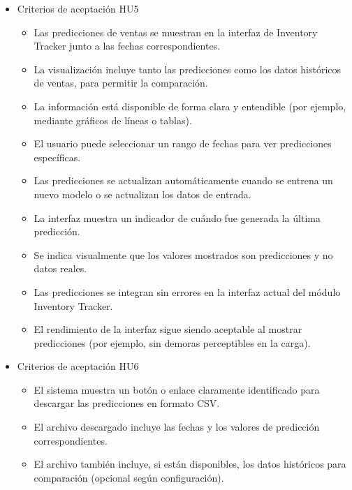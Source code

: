 \documentclass[
11pt, %
]{charter}
\begin{document}
\begin{itemize}
\begin{itemize}
      \item Criterios de aceptación HU5
      \begin{itemize}
      \item Las predicciones de ventas se muestran en la interfaz de Inventory Tracker junto a las fechas correspondientes.

      \item La visualización incluye tanto las predicciones como los datos históricos de ventas, para permitir la comparación.

      \item La información está disponible de forma clara y entendible (por ejemplo, mediante gráficos de líneas o tablas).

      \item El usuario puede seleccionar un rango de fechas para ver predicciones específicas.

      \item Las predicciones se actualizan automáticamente cuando se entrena un nuevo modelo o se actualizan los datos de entrada.

      \item La interfaz muestra un indicador de cuándo fue generada la última predicción.

      \item Se indica visualmente que los valores mostrados son predicciones y no datos reales.

      \item Las predicciones se integran sin errores en la interfaz actual del módulo Inventory Tracker.

      \item El rendimiento de la interfaz sigue siendo aceptable al mostrar predicciones (por ejemplo, sin demoras perceptibles en la carga).
	\end{itemize}
	
      \item Criterios de aceptación HU6
	\begin{itemize}
      \item El sistema muestra un botón o enlace claramente identificado para descargar las predicciones en formato CSV.

      \item El archivo descargado incluye las fechas y los valores de predicción correspondientes.

      \item El archivo también incluye, si están disponibles, los datos históricos para comparación (opcional según configuración).


\end{itemize}
\end{itemize}
\end{itemize}
\end{document}
